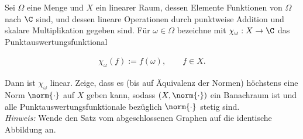 \begin{exercise}

Sei $\Omega$ eine Menge und $X$ ein linearer Raum, dessen Elemente Funktionen von $\Omega$ nach $\C$ sind, und dessen lineare Operationen durch punktweise Addition und skalare Multiplikation gegeben sind.
Für $\omega \in \Omega$ bezeichne mit $\chi_{\omega}: X \rightarrow \C$ das Punktauswertungsfunktional

\begin{align*}
  \chi_{\omega}(f) := f(\omega), \qquad f \in X.
\end{align*}

Dann ist $\chi_{\omega}$ linear.
Zeige, dass es (bis auf Äquivalenz der Normen) höchstens eine Norm $\norm{\cdot}$ auf $X$ geben kann, sodass $(X, \norm{\cdot})$ ein Banachraum ist und alle Punktauswertungsfunktionale bezüglich $\norm{\cdot}$ stetig sind. \\

\textit{Hinweis:}
Wende den Satz vom abgeschlossenen Graphen auf die identische Abbildung an.

\end{exercise}

